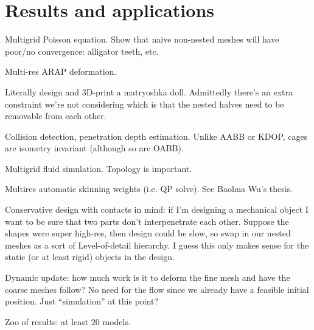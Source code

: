 
\section{Results and applications}
\label{sec:results}

Multigrid Poisson equation. Show that naive non-nested meshes will have
poor/no convergence: alligator teeth, etc.

Multi-res ARAP deformation. 

Literally design and 3D-print a matryoshka doll. Admittedly there's an extra
constraint we're not considering which is that the nested halves need to be
removable from each other.

Collision detection, penetration depth estimation. Unlike AABB or KDOP, cages
are isometry invariant (although so are OABB).

Multigrid fluid simulation. Topology is important.

Multires automatic skinning weights (i.e. QP solve). See Baohua Wu's thesis.

Conservative design with contacts in mind: if I'm designing a mechanical object
I want to be sure that two parts don't interpenetrate each other. Suppose the
shapes were super high-res, then design could be slow, so swap in our nested
meshes as a sort of Level-of-detail hierarchy. I guess this only makes sense
for the static (or at least rigid) objects in the design.

Dynamic update: how much work is it to deform the fine mesh and have the coarse
meshes follow? No need for the flow since we already have a feasible initial
position. Just ``simulation'' at this point?

Zoo of results: at least 20 models.
